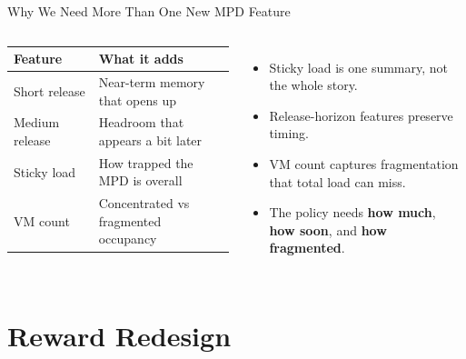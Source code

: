 \documentclass[10pt,aspectratio=169]{beamer}
\begin{document}
\begin{frame}{Why We Need More Than One New MPD Feature}
  \begin{columns}[T,onlytextwidth]
      \small
      \begin{tabular}{p{0.35\linewidth}p{0.56\linewidth}}
        \toprule
        \textbf{Feature} & \textbf{What it adds} \\
        \midrule
        Short release & Near-term memory that opens up \\
        Medium release & Headroom that appears a bit later \\
        Sticky load & How trapped the MPD is overall \\
        VM count & Concentrated vs fragmented occupancy \\
        \bottomrule
      \end{tabular}
      \begin{itemize}
        \item Sticky load is one summary, not the whole story.
        \item Release-horizon features preserve timing.
        \item VM count captures fragmentation that total load can miss.
        \item The policy needs \textbf{how much}, \textbf{how soon}, and \textbf{how fragmented}.
      \end{itemize}
  \end{columns}
\end{frame}

\section{Reward Redesign}
\end{document}
